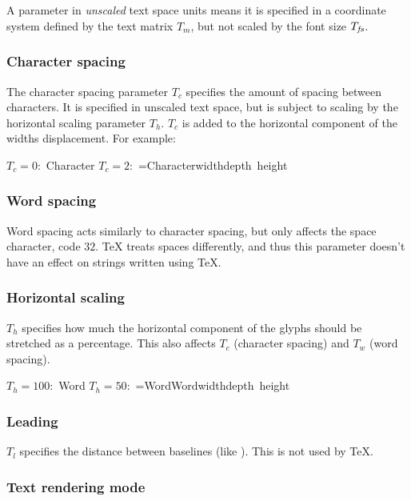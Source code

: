 A parameter in {\it unscaled} text space units means it is specified in a coordinate system defined by the
text matrix $T_m$, but not scaled by the font size $T_{\it fs}$.

\subsubsection{Character spacing}

The character spacing parameter $T_c$ specifies the amount of spacing between characters.
It is specified in unscaled text space, but is subject to scaling by the horizontal scaling parameter
$T_h$.
$T_c$ is added to the horizontal component of the widths displacement.
For example:

\hbox{$T_c=0$: Character}
\hbox{$T_c=2$: =\hbox{Character}\vrule width\z@ depth height%
}

\subsubsection{Word spacing}

Word spacing acts similarly to character spacing, but only affects the space character, code $32$.
\TeX{} treats spaces differently, and thus this parameter doesn't have an effect on strings written using
\TeX.

\subsubsection{Horizontal scaling}

$T_h$ specifies how much the horizontal component of the glyphs should be stretched as a percentage.
This also affects $T_c$ (character spacing) and $T_w$ (word spacing).

\hbox{$T_h=100$: Word}
\hbox{$T_h=50$: =\hbox{WordWord}\vrule width\z@ depth height%
}

\subsubsection{Leading}

$T_l$ specifies the distance between baselines (like \macro\baselineskip).
This is not used by \TeX.

\subsubsection{Text rendering mode}


